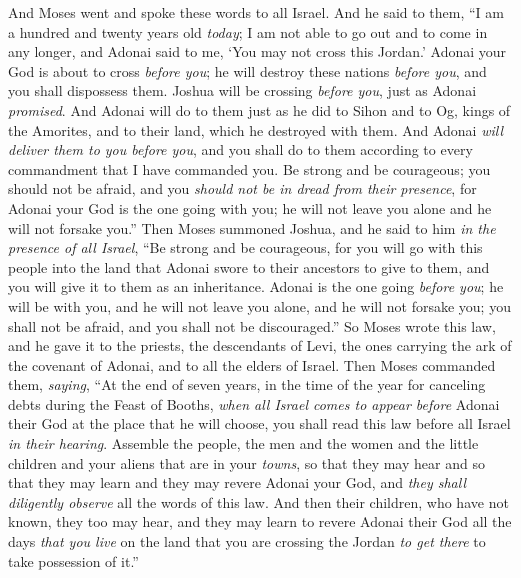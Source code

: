 \begin{biblechapter} %
 And Moses went and spoke these words to all Israel.
\verse And he said to them, “I am a hundred and twenty years old \textit{today}; I am not able to go out and to come in any longer, and Adonai said to me, ‘You may not cross this Jordan.’
\verse Adonai your God is about to cross \textit{before you}; he will destroy these nations \textit{before you}, and you shall dispossess them. Joshua will be crossing \textit{before you}, just as Adonai \textit{promised}.
\verse And Adonai will do to them just as he did to Sihon and to Og, kings of the Amorites, and to their land, which he destroyed with them.
\verse And Adonai \textit{will deliver them to you before you}, and you shall do to them according to every commandment that I have commanded you.
\verse Be strong and be courageous; you should not be afraid, and you \textit{should not be in dread from their presence}, for Adonai your God is the one going with you; he will not leave you alone and he will not forsake you.”
\verse Then Moses summoned Joshua, and he said to him \textit{in the presence of all Israel}, “Be strong and be courageous, for you will go with this people into the land that Adonai swore to their ancestors to give to them, and you will give it to them as an inheritance.
\verse Adonai is the one going \textit{before you}; he will be with you, and he will not leave you alone, and he will not forsake you; you shall not be afraid, and you shall not be discouraged.”
\verse So Moses wrote this law, and he gave it to the priests, the descendants of Levi, the ones carrying the ark of the covenant of Adonai, and to all the elders of Israel.
\verse Then Moses commanded them, \textit{saying}, “At the end of seven years, in the time of the year for canceling debts during the Feast of Booths,
\verse \textit{when all Israel comes to appear before} Adonai their God at the place that he will choose, you shall read this law before all Israel \textit{in their hearing}.
\verse Assemble the people, the men and the women and the little children and your aliens that are in your \textit{towns}, so that they may hear and so that they may learn and they may revere Adonai your God, and \textit{they shall diligently observe} all the words of this law.
\verse And then their children, who have not known, they too may hear, and they may learn to revere Adonai their God all the days \textit{that you live} on the land that you are crossing the Jordan \textit{to get there} to take possession of it.”

\end{biblechapter}
